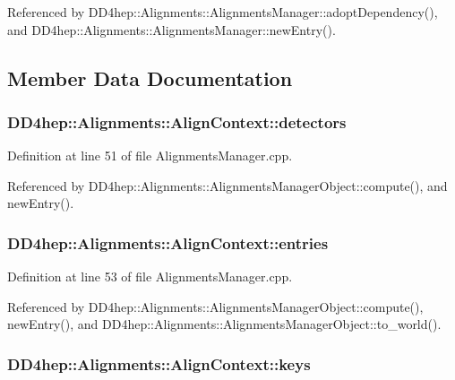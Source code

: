 Referenced by DD4hep::Alignments::AlignmentsManager::adoptDependency(), and DD4hep::Alignments::AlignmentsManager::newEntry().

\subsection{Member Data Documentation}
\hypertarget{class_d_d4hep_1_1_alignments_1_1_align_context_a752624c02c61692d9e56cfccd43adaa7}{
\subsubsection[{detectors}]{ {\bf DD4hep::Alignments::AlignContext::detectors}}}
\label{class_d_d4hep_1_1_alignments_1_1_align_context_a752624c02c61692d9e56cfccd43adaa7}


Definition at line 51 of file AlignmentsManager.cpp.

Referenced by DD4hep::Alignments::AlignmentsManagerObject::compute(), and newEntry().\hypertarget{class_d_d4hep_1_1_alignments_1_1_align_context_a7ac8a0b3a176098807efafdc3a429cd5}{
\subsubsection[{entries}]{ {\bf DD4hep::Alignments::AlignContext::entries}}}
\label{class_d_d4hep_1_1_alignments_1_1_align_context_a7ac8a0b3a176098807efafdc3a429cd5}


Definition at line 53 of file AlignmentsManager.cpp.

Referenced by DD4hep::Alignments::AlignmentsManagerObject::compute(), newEntry(), and DD4hep::Alignments::AlignmentsManagerObject::to\_\-world().\hypertarget{class_d_d4hep_1_1_alignments_1_1_align_context_ab4f2ddd57d4f86566bb37d5c6779b6d2}{
\subsubsection[{keys}]{ {\bf DD4hep::Alignments::AlignContext::keys}}}
\label{class_d_d4hep_1_1_alignments_1_1_align_context_ab4f2ddd57d4f86566bb37d5c6779b6d2}


